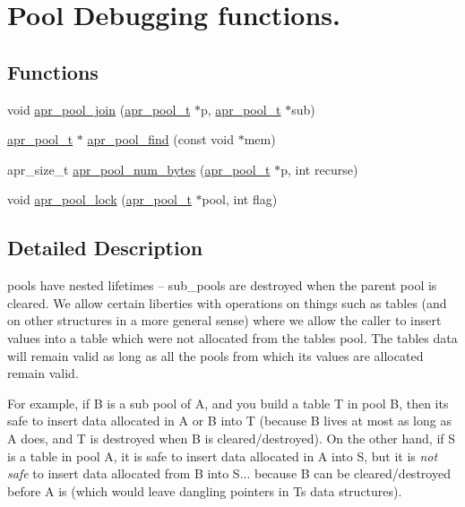 \hypertarget{group___pool_debug}{}\section{Pool Debugging functions.}
\label{group___pool_debug}
\subsection*{Functions}
\begin{DoxyCompactItemize}
\item 
void \hyperlink{group___pool_debug_gaecd956092f81c70117507ad8cbca8ea7}{apr\+\_\+pool\+\_\+join} (\hyperlink{group__apr__pools_gaf137f28edcf9a086cd6bc36c20d7cdfb}{apr\+\_\+pool\+\_\+t} $\ast$p, \hyperlink{group__apr__pools_gaf137f28edcf9a086cd6bc36c20d7cdfb}{apr\+\_\+pool\+\_\+t} $\ast$sub)
\item 
\hyperlink{group__apr__pools_gaf137f28edcf9a086cd6bc36c20d7cdfb}{apr\+\_\+pool\+\_\+t} $\ast$ \hyperlink{group___pool_debug_ga0bc40d9069709020e3643492dae2ccb0}{apr\+\_\+pool\+\_\+find} (const void $\ast$mem)
\item 
apr\+\_\+size\+\_\+t \hyperlink{group___pool_debug_ga22462da23d70dfde389a370b131cd351}{apr\+\_\+pool\+\_\+num\+\_\+bytes} (\hyperlink{group__apr__pools_gaf137f28edcf9a086cd6bc36c20d7cdfb}{apr\+\_\+pool\+\_\+t} $\ast$p, int recurse)
\item 
void \hyperlink{group___pool_debug_ga24f8f0287478fa71f77d0ce4ec035e4a}{apr\+\_\+pool\+\_\+lock} (\hyperlink{group__apr__pools_gaf137f28edcf9a086cd6bc36c20d7cdfb}{apr\+\_\+pool\+\_\+t} $\ast$pool, int flag)
\end{DoxyCompactItemize}


\subsection{Detailed Description}
pools have nested lifetimes -- sub\+\_\+pools are destroyed when the parent pool is cleared. We allow certain liberties with operations on things such as tables (and on other structures in a more general sense) where we allow the caller to insert values into a table which were not allocated from the table\textquotesingle{}s pool. The table\textquotesingle{}s data will remain valid as long as all the pools from which its values are allocated remain valid.

For example, if B is a sub pool of A, and you build a table T in pool B, then it\textquotesingle{}s safe to insert data allocated in A or B into T (because B lives at most as long as A does, and T is destroyed when B is cleared/destroyed). On the other hand, if S is a table in pool A, it is safe to insert data allocated in A into S, but it is {\itshape not safe} to insert data allocated from B into S... because B can be cleared/destroyed before A is (which would leave dangling pointers in T\textquotesingle{}s data structures).

